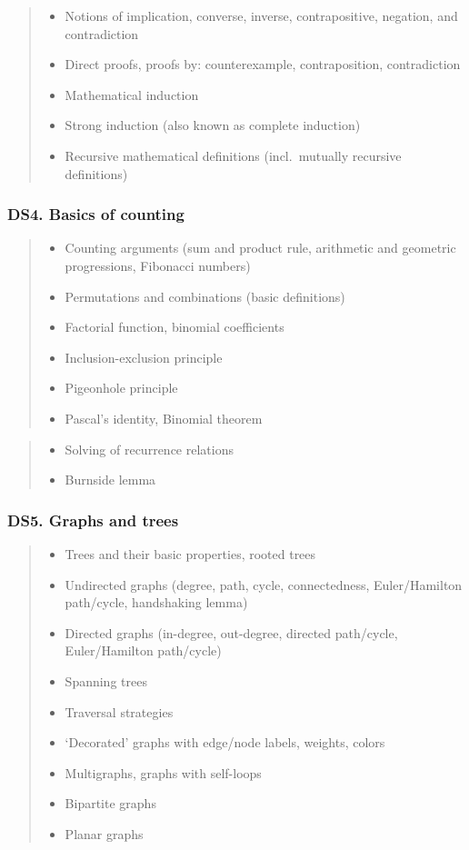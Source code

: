 \documentclass[a4paper,11pt,oneside]{article}
\newcommand{\cmark}{\ding{51}}%
\newcommand{\xmark}{\ding{55}}%
\newcommand{\CC}[1]{#1}
\newcommand{\cincl}{{\small\cmark}}
\newcommand{\cdefi}{{\small\cmark\faFileTextO}}
\newcommand{\ccode}{{\small\cmark\faFileText}}
\newcommand{\cexcl}{{\small\xmark}}
\newcommand{\Iincluded}{\item[\hbox to 1.8em{\cincl\hfill}]}
\newcommand{\Idefine}{\item[\hbox to 1.8em{\cdefi\hfill}]}
\newcommand{\Icodeonly}{\item[\hbox to 1.8em{\ccode\hfill}]}
\newcommand{\Iexcluded}{\item[\hbox to 1.8em{\cexcl\hfill}]}
\newenvironment{myitemize}{\begin{quote}\begin{itemize}\itemsep 0pt}{\end{itemize}\end{quote}}
\begin{document}
        \begin{myitemize}
        \Idefine\CC{Notions of implication, converse, inverse, contrapositive, negation, and contradiction}
        \Icodeonly\CC{Direct proofs, proofs by: counterexample, contraposition, contradiction}
        \Icodeonly\CC{Mathematical induction}
        \Icodeonly\CC{Strong induction} (also known as complete induction)
        \Iincluded\CC{Recursive mathematical definitions} (incl.\ mutually recursive definitions)
        \end{myitemize}

    \subsubsection*{DS4. Basics of counting}

        \begin{myitemize}
        \Iincluded\CC{Counting arguments (sum and product rule, arithmetic and geometric progressions, Fibonacci numbers)}
        \Idefine\CC{Permutations and combinations (basic definitions)}
        \Idefine Factorial function, binomial coefficients
        \Icodeonly\CC{Inclusion-exclusion principle}
        \Icodeonly\CC{Pigeonhole principle}
        \Icodeonly\CC{Pascal's identity}, \CC{Binomial theorem}
        \end{myitemize}

        \begin{myitemize}
        \Iexcluded Solving of recurrence relations
        \Iexcluded Burnside lemma
        \end{myitemize}
  
    \subsubsection*{DS5. Graphs and trees}

        \begin{myitemize}
        \Idefine\CC{Trees} and their basic properties, rooted trees
        \Idefine\CC{Undirected graphs} (degree, path, cycle, connectedness, Euler/Hamil\-ton path/cycle, handshaking lemma)
        \Idefine\CC{Directed graphs} (in-degree, out-degree, directed path/cycle, Euler/Hamilton path/cycle)
        \Idefine\CC{Spanning trees}
        \Idefine\CC{Traversal strategies}
        \Idefine `Decorated' graphs with edge/node labels, weights, colors
        \Idefine Multigraphs, graphs with self-loops
        \Idefine Bipartite graphs
        \Icodeonly Planar graphs
        \end{myitemize}
\end{document}
